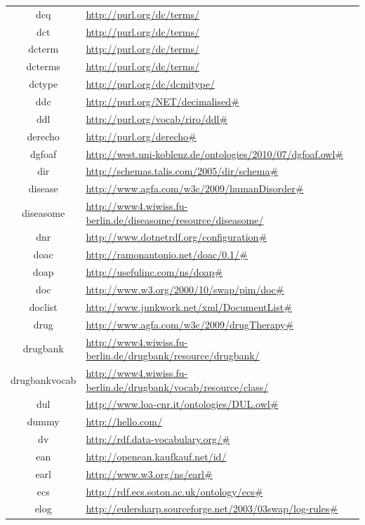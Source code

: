 \documentclass{article}
\begin{document}
\begin{longtable}{ c | p{8cm} }
		dcq & \url{http://purl.org/dc/terms/} \\
		dct & \url{http://purl.org/dc/terms/} \\
		dcterm & \url{http://purl.org/dc/terms/} \\
		dcterms & \url{http://purl.org/dc/terms/} \\
		dctype & \url{http://purl.org/dc/dcmitype/} \\
		ddc & \url{http://purl.org/NET/decimalised#} \\
		ddl & \url{http://purl.org/vocab/riro/ddl#} \\
		derecho & \url{http://purl.org/derecho#} \\
		dgfoaf & \url{http://west.uni-koblenz.de/ontologies/2010/07/dgfoaf.owl#} \\
		dir & \url{http://schemas.talis.com/2005/dir/schema#} \\
		disease & \url{http://www.agfa.com/w3c/2009/humanDisorder#} \\
		diseasome & \url{http://www4.wiwiss.fu-berlin.de/diseasome/resource/diseasome/} \\
		dnr & \url{http://www.dotnetrdf.org/configuration#} \\
		doac & \url{http://ramonantonio.net/doac/0.1/#} \\
		doap & \url{http://usefulinc.com/ns/doap#} \\
		doc & \url{http://www.w3.org/2000/10/swap/pim/doc#} \\
		doclist & \url{http://www.junkwork.net/xml/DocumentList#} \\
		drug & \url{http://www.agfa.com/w3c/2009/drugTherapy#} \\
		drugbank & \url{http://www4.wiwiss.fu-berlin.de/drugbank/resource/drugbank/} \\
		drugbankvocab & \url{http://www4.wiwiss.fu-berlin.de/drugbank/vocab/resource/class/} \\
		dul & \url{http://www.loa-cnr.it/ontologies/DUL.owl#} \\
		dummy & \url{http://hello.com/} \\
		dv & \url{http://rdf.data-vocabulary.org/#} \\
		ean & \url{http://openean.kaufkauf.net/id/} \\
		earl & \url{http://www.w3.org/ns/earl#} \\
		ecs & \url{http://rdf.ecs.soton.ac.uk/ontology/ecs#} \\
		elog & \url{http://eulersharp.sourceforge.net/2003/03swap/log-rules#} \\

\end{longtable}
\end{document}
